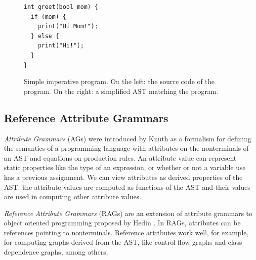 \documentclass[10pt, twoside, openright]{book}
\begin{document}
\begin{figure}
  \centering
\begin{minipage}{.5\textwidth}
\begin{lstlisting}
int greet(bool mom) {
  if (mom) {
    print("Hi Mom!");
  } else {
    print("Hi!");
  }
}
\end{lstlisting}
\end{minipage}%
\begin{minipage}{.5\textwidth}
\end{minipage}
\caption{Simple imperative program.
On the left: the source code of the program.
On the right: a simplified AST matching the program.
}
\label{fig:ast1}
\end{figure}


\subsection{Reference Attribute Grammars}
\label{sec:rags}

\emph{Attribute Grammars} (AGs) were introduced by Knuth \cite{DBLP:journals/mst/Knuth68} as a formalism
for defining the semantics of a programming language with attributes on the nonterminals of
an AST and equations on production rules.
An attribute value can represent static
properties like the type of an expression, or whether or not a variable use has a previous assignment.
We can view attributes as derived properties of the AST: the attribute values are computed as
functions of the AST and their values are used in computing other attribute values.

\emph{Reference Attribute Grammars} (RAGs) are an extension of attribute grammars to object
oriented programming proposed by Hedin \cite{DBLP:journals/informaticaSI/Hedin00}.
In RAGs, attributes can be references pointing to nonterminals.
Reference attributes work well, for example, for computing graphs derived from the AST,
like control flow graphs and class dependence graphs, among others.
\end{document}
